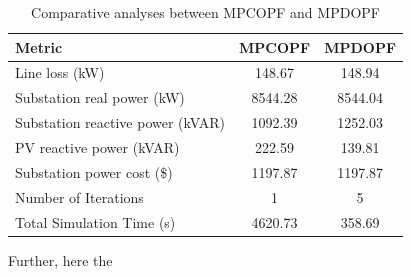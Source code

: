 \documentclass[../../outputs/main.tex]{subfiles}
\begin{document}
\begin{table}[h!]
    \centering
    \caption{Comparative analyses between MPCOPF and MPDOPF}
    \begin{tabular}{|l|c|c|}
    \hline
    \textbf{Metric} & \textbf{MPCOPF} & \textbf{MPDOPF} \\ \hline
    Line loss (kW) & 148.67 & 148.94 \\ \hline
    Substation real power (kW) & 8544.28 & 8544.04 \\ \hline
    Substation reactive power (kVAR) & 1092.39 & 1252.03 \\ \hline
    PV reactive power (kVAR) & 222.59 & 139.81 \\ \hline
    Substation power cost (\$) & 1197.87 & 1197.87 \\ \hline
    Number of Iterations & 1 & 5 \\ \hline
    Total Simulation Time (s) & 4620.73 & 358.69 \\ \hline
    \end{tabular}
    \label{table:opt-10-20-30}
\end{table}



Further, here the 
\end{document}
